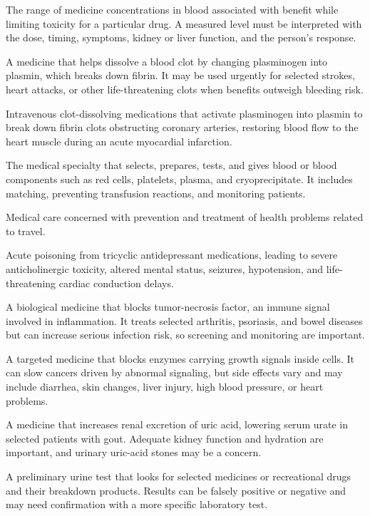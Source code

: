  The range of medicine concentrations in blood associated with benefit while limiting toxicity for a particular drug. A measured level must be interpreted with the dose, timing, symptoms, kidney or liver function, and the person’s response.

 A medicine that helps dissolve a blood clot by changing plasminogen into plasmin, which breaks down fibrin. It may be used urgently for selected strokes, heart attacks, or other life-threatening clots when benefits outweigh bleeding risk.

 Intravenous clot-dissolving medications that activate plasminogen into plasmin to break down fibrin clots obstructing coronary arteries, restoring blood flow to the heart muscle during an acute myocardial infarction.


 The medical specialty that selects, prepares, tests, and gives blood or blood components such as red cells, platelets, plasma, and cryoprecipitate. It includes matching, preventing transfusion reactions, and monitoring patients.

 Medical care concerned with prevention and treatment of health problems related to travel.

 Acute poisoning from tricyclic antidepressant medications, leading to severe anticholinergic toxicity, altered mental status, seizures, hypotension, and life-threatening cardiac conduction delays.


 A biological medicine that blocks tumor-necrosis factor, an immune signal involved in inflammation. It treats selected arthritis, psoriasis, and bowel diseases but can increase serious infection risk, so screening and monitoring are important.


 A targeted medicine that blocks enzymes carrying growth signals inside cells. It can slow cancers driven by abnormal signaling, but side effects vary and may include diarrhea, skin changes, liver injury, high blood pressure, or heart problems.

 A medicine that increases renal excretion of uric acid, lowering serum urate in selected patients with gout. Adequate kidney function and hydration are important, and urinary uric-acid stones may be a concern.

 A preliminary urine test that looks for selected medicines or recreational drugs and their breakdown products. Results can be falsely positive or negative and may need confirmation with a more specific laboratory test.

